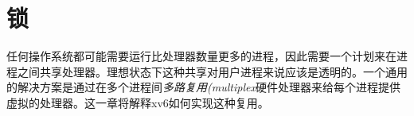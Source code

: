 \chapter{锁}\label{ch06}

任何操作系统都可能需要运行比处理器数量更多的进程，因此需要一个计划来在进程之间共享处理器。理想状态下这种共享对用户进程来说应该是透明的。一个通用的解决方案是通过在多个进程间\emph{多路复用(multiplex}硬件处理器来给每个进程提供虚拟的处理器。这一章将解释xv6如何实现这种复用。
